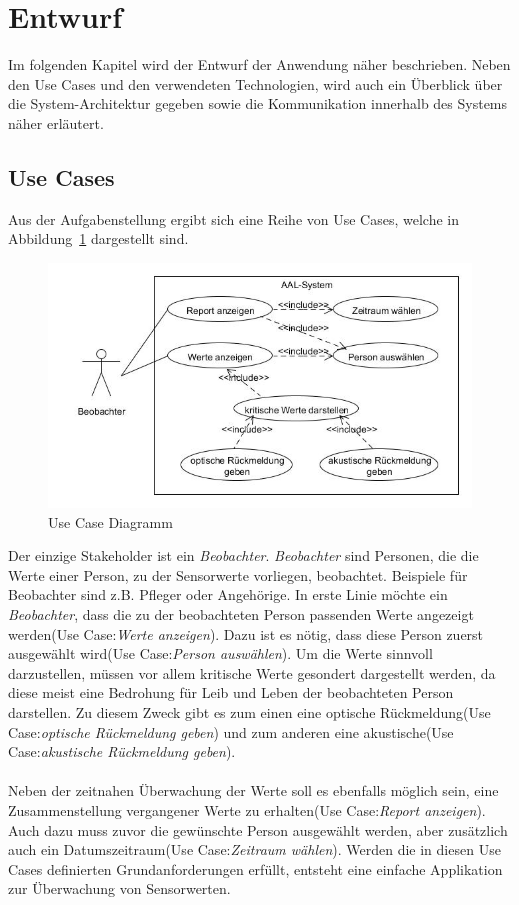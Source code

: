\section{Entwurf}
\label{sec:Entwurf}
Im folgenden Kapitel wird der Entwurf der Anwendung näher beschrieben. Neben den Use Cases und den verwendeten Technologien, wird auch ein Überblick über die System-Architektur gegeben sowie die Kommunikation innerhalb des Systems näher erläutert.

\subsection{Use Cases}
\label{subsec:UseCases}
Aus der Aufgabenstellung ergibt sich eine Reihe von Use Cases, welche in Abbildung~\ref{fig:UseCaseDiagramm} dargestellt sind. 

\begin{figure}[h]
\begin{center}
\includegraphics[scale=0.7]{images/AAL-Use-Case-Diagramm.jpg} 
\caption{Use Case Diagramm}
\label{fig:UseCaseDiagramm}
\end{center}
\end{figure}

Der einzige Stakeholder ist ein \textit{Beobachter}. \textit{Beobachter} sind Personen, die die Werte einer Person, zu der Sensorwerte vorliegen, beobachtet. Beispiele für Beobachter sind z.B. Pfleger oder Angehörige. In erste Linie möchte ein \textit{Beobachter}, dass die zu der beobachteten Person passenden Werte angezeigt werden(Use Case:\textit{Werte anzeigen}). Dazu ist es nötig, dass diese Person zuerst ausgewählt wird(Use Case:\textit{Person auswählen}). Um die Werte sinnvoll darzustellen, müssen vor allem kritische Werte gesondert dargestellt werden, da diese meist eine Bedrohung für Leib und Leben der beobachteten Person darstellen. Zu diesem Zweck gibt es zum einen eine optische Rückmeldung(Use Case:\textit{optische Rückmeldung geben}) und zum anderen eine akustische(Use Case:\textit{akustische Rückmeldung geben}).
\\
\\
Neben der zeitnahen Überwachung der Werte soll es ebenfalls möglich sein, eine Zusammenstellung vergangener Werte zu erhalten(Use Case:\textit{Report anzeigen}). Auch dazu muss zuvor die gewünschte Person ausgewählt werden, aber zusätzlich auch ein Datumszeitraum(Use Case:\textit{Zeitraum wählen}). Werden die in diesen Use Cases definierten Grundanforderungen erfüllt, entsteht eine einfache Applikation zur Überwachung von Sensorwerten.


